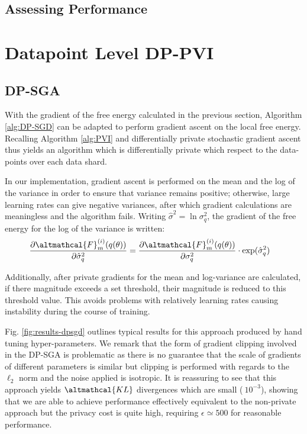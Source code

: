\subsection{Assessing Performance}

\section{Datapoint Level DP-PVI}
\subsection{DP-SGA}
With the gradient of the free energy calculated in the previous section, Algorithm \ref{alg:DP-SGD} can be adapted to perform gradient ascent on the local free energy. Recalling Algorithm \ref{alg:PVI} and differentially private stochastic gradient ascent thus yields an algorithm which is differentially private which respect to the data-points over each data shard. 

In our implementation, gradient ascent is performed on the mean and the log of the variance in order to ensure that variance remains positive; otherwise, large learning rates can give negative variances, after which gradient calculations are meaningless and the algorithm fails. Writing $\hat{\sigma}^2 = \ln \sigma_q^2$, the gradient of the free energy for the log of the variance is written:
\begin{align}
\frac{\partial \altmathcal{F}_{m}^{(i)}(q(\theta))}{\partial \hat{\sigma}_q^2} &= \frac{\partial \altmathcal{F}_{m}^{(i)}(q(\theta))}{\partial \sigma_q^2} \cdot \exp(\hat{\sigma}_q^2)
\end{align}

Additionally, after private gradients for the mean and  log-variance are calculated, if there magnitude exceeds a set threshold, their magnitude is reduced to this threshold value. This avoids problems with relatively learning rates causing instability during the course of training. 

Fig. \ref{fig:results-dpsgd} outlines typical results for this approach produced by hand tuning hyper-parameters. We remark that the form of gradient clipping involved in the DP-SGA is problematic as there is no guarantee that the scale of gradients of different parameters is similar but clipping is performed with regards to the $\ell_2$ norm and the noise applied is isotropic. It is reassuring to see that this approach yields $\altmathcal{KL}$ divergences which are small ($~10^{-3}$), showing that we are able to achieve performance effectively equivalent to the non-private approach but the privacy cost is quite high, requiring $\epsilon \simeq 500$ for reasonable performance. 

